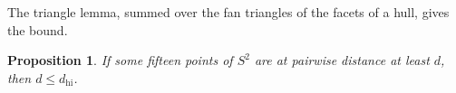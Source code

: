 \documentclass[12pt]{amsart}
\newtheorem{proposition}[theorem]{Proposition}
\theoremstyle{definition}
\theoremstyle{plain}
\theoremstyle{definition}
\newcommand{\Sph}{S^2}
\newcommand{\dhi}{d_{\mathrm{hi}}}
\newcommand{\leanmap}[1]{\ignorespaces}
\newcommand{\mapnote}[1]{\ignorespaces}
\begin{document}
The triangle lemma, summed over the fan triangles of the facets of a hull, gives the bound.

\begin{proposition}\label{prop:ftbound}\leanmap{Tammes15.fejesToth_bound, Tammes15.FejesToth.N1, Tammes15.FejesToth.N2, Tammes15.FejesToth.exists_saturated, Tammes15.FejesToth.sep_card_bound, Tammes15.FejesToth.hB_of_sat, Tammes15.FejesToth.facetPolar_norm_lt, Tammes15.FejesToth.facet_fan_bound, Tammes15.FejesToth.hull_fan_count, Tammes15.hullGraph, Tammes15.exists_angular, Tammes15.facetPolar, Tammes15.isFacetPolar_facetPolar, Tammes15.facetPolar_strict, Tammes15.hull_corner_total, Tammes15.hull_euler}\mapnote{of type \texttt{Tammes15.FejesTothBound}}
If some fifteen points of $\Sph$ are at pairwise distance at least $d$, then $d\le\dhi$.
\end{proposition}
\end{document}
